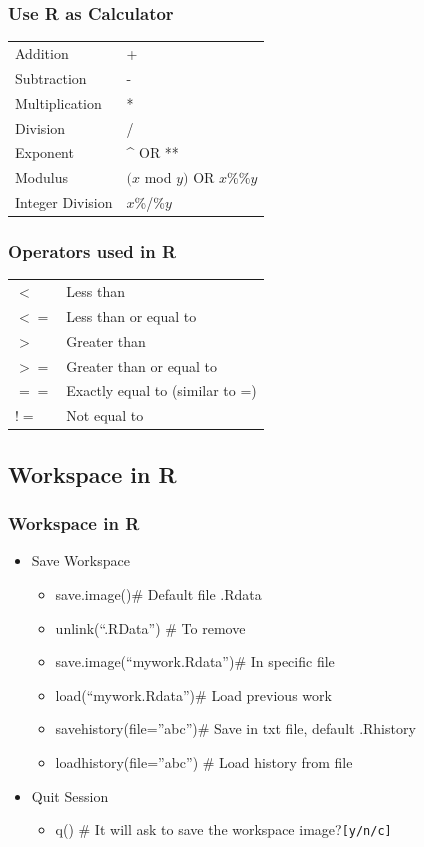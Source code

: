 \documentclass[12pt]{beamer}
\begin{document}
\begin{frame}
\frametitle{Use R as Calculator}
\begin{tabular}{ll}
 Addition &+\\
 Subtraction &-\\
 Multiplication &*\\
 Division &/\\
 Exponent &\^{} OR **\\
 Modulus &$(x$ mod $y)$ OR $x$\%\%$y$\\
 Integer Division &$x$\%/\%$y$\\
\end{tabular}
\end{frame}

\begin{frame}
\frametitle{Operators used in R}
\begin{tabular}{ll}
$<$ &Less than\\
$<=$ &Less than or equal to\\
$>$ &Greater than\\
$>=$ &Greater than or equal to\\
$==$ &Exactly equal to (similar to =)\\
$!=$ &Not equal to\\
\end{tabular}
\end{frame}

\begin{frame}[fragile]
\section{Workspace in R}
\frametitle{Workspace in R }
\begin{itemize}\justifying
	\item Save Workspace
	\begin{itemize}\justifying
		\item save.image()\hfill \# Default file .Rdata
		\item unlink(“.RData”) \hfill \# To remove
		\item save.image(“mywork.Rdata”)\hfill  \# In specific file
		\item load(“mywork.Rdata”)\hfill  \# Load previous work
		\item savehistory(file=”abc”)\hfill  \# Save in txt file, default .Rhistory
		\item loadhistory(file=”abc”) \hfill \# Load history from file
	\end{itemize}
	\item Quit Session
	\begin{itemize}\justifying
	\item q() \hfill \# It will ask to save the workspace image?\hfill  \verb|[y/n/c]|
\end{itemize}
\end{itemize}
\end{frame}
\end{document}
